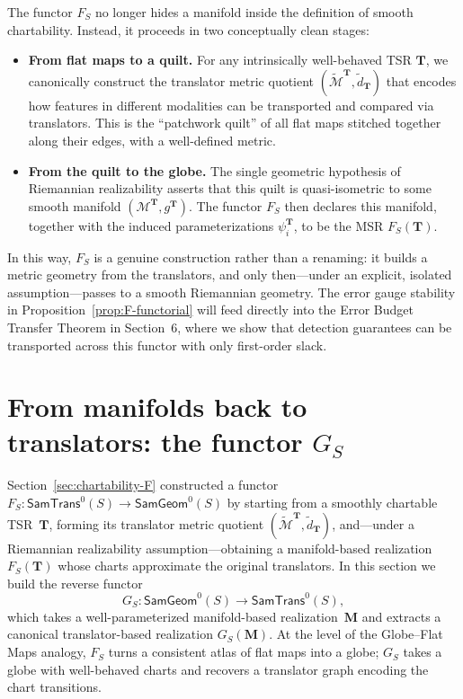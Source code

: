 \documentclass[11pt]{article}
\newcommand{\SamTrans}{\mathsf{SamTrans}}
\newcommand{\SamGeom}{\mathsf{SamGeom}}
\begin{document}
The functor $F_S$ no longer hides a manifold inside the definition of
smooth chartability.  Instead, it proceeds in two conceptually clean
stages:

\begin{itemize}
  \item \textbf{From flat maps to a quilt.}  For any intrinsically
        well-behaved TSR $\mathbf{T}$, we canonically construct the
        translator metric quotient
        $(\widetilde{\mathcal{M}}^{\mathbf{T}}, \tilde d_{\mathbf{T}})$
        that encodes how features in different modalities can be
        transported and compared via translators.  This is the ``patchwork
        quilt'' of all flat maps stitched together along their edges,
        with a well-defined metric.
  \item \textbf{From the quilt to the globe.}  The single geometric
        hypothesis of Riemannian realizability asserts that this quilt
        is quasi-isometric to some smooth manifold
        $(\mathcal{M}^{\mathbf{T}}, g^{\mathbf{T}})$.  The functor $F_S$
        then declares this manifold, together with the induced
        parameterizations $\psi_i^{\mathbf{T}}$, to be the MSR
        $F_S(\mathbf{T})$.
\end{itemize}

In this way, $F_S$ is a genuine construction rather than a renaming:
it builds a metric geometry from the translators, and only then---under
an explicit, isolated assumption---passes to a smooth Riemannian
geometry.  The error gauge stability in
Proposition~\ref{prop:F-functorial} will feed directly into the Error
Budget Transfer Theorem in Section~6, where we show that detection
guarantees can be transported across this functor with only
first-order slack.
\section{From manifolds back to translators: the functor \texorpdfstring{$G_S$}{G\_S}}
\label{sec:G-construction}

Section~\ref{sec:chartability-F} constructed a functor
$F_S : \SamTrans^0(S) \to \SamGeom^0(S)$
by starting from a smoothly chartable TSR~$\mathbf{T}$, forming its translator
metric quotient $(\widetilde{\mathcal{M}}^{\mathbf{T}}, \tilde d_{\mathbf{T}})$, and---under a
Riemannian realizability assumption---obtaining a manifold-based realization
$F_S(\mathbf{T})$ whose charts approximate the original translators.
In this section we build the reverse functor
\[
G_S : \SamGeom^0(S) \to \SamTrans^0(S),
\]
which takes a well-parameterized manifold-based realization~$\mathbf{M}$ and
extracts a canonical translator-based realization $G_S(\mathbf{M})$. At the
level of the Globe–Flat Maps analogy, $F_S$ turns a consistent atlas of flat
maps into a globe; $G_S$ takes a globe with well-behaved charts and recovers
a translator graph encoding the chart transitions.
\end{document}
